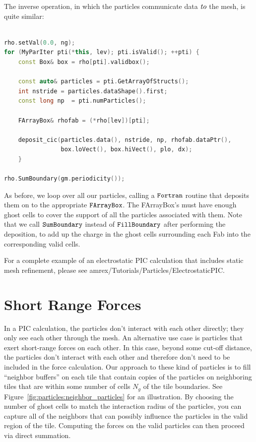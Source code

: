 The inverse operation, in which the particles communicate data $\emph{to}$ the mesh, is quite similar:

\begin{lstlisting}[language=cpp]

rho.setVal(0.0, ng);
for (MyParIter pti(*this, lev); pti.isValid(); ++pti) {
    const Box& box = rho[pti].validbox();

    const auto& particles = pti.GetArrayOfStructs();
    int nstride = particles.dataShape().first;
    const long np  = pti.numParticles();

    FArrayBox& rhofab = (*rho[lev])[pti];

    deposit_cic(particles.data(), nstride, np, rhofab.dataPtr(), 
                box.loVect(), box.hiVect(), plo, dx);
    }

rho.SumBoundary(gm.periodicity());

\end{lstlisting}

As before, we loop over all our particles, calling a $\tt{Fortran}$ routine that deposits them on to the appropriate $\tt{FArrayBox}$. The FArrayBox's must have enough ghost cells to
cover the support of all the particles associated with them. Note that we call $\tt{SumBoundary}$ instead of $\tt{FillBoundary}$ after performing the deposition, to add up the charge 
in the ghost cells surrounding each Fab into the corresponding valid cells.

For a complete example of an electrostatic PIC calculation that includes static mesh refinement, please see amrex/Tutorials/Particles/ElectrostaticPIC.

\section{Short Range Forces}
\label{sec:Particles:ShortRange}

In a PIC calculation, the particles don't interact with each other directly; they only see each other through the mesh. An alternative use case is particles that exert short-range forces on each other. In this case, beyond some cut-off distance, the particles don't interact with each other and therefore don't need to be included in the force calculation. Our approach to these kind of particles is to fill ``neighbor buffers'' on each tile that contain copies of the particles on neighboring tiles that are within some number of cells $N_g$ of the tile boundaries. See Figure~\ref{fig:particles:neighbor_particles} for an illustration. By choosing the number of ghost cells to match the interaction radius of the particles, you can capture all of the neighbors that can possibly influence the particles in the valid region of the tile. Computing the forces on the valid particles can then proceed via direct summation.

